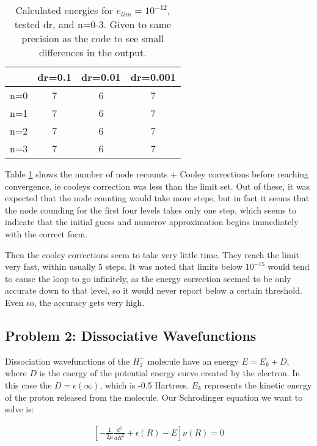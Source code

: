 \documentclass{article}
\begin{document}
    \begin{table}[H]
    	\centering
    	\caption{Calculated energies for $e_{lim}=10^{-12}$, tested dr, and n=0-3. Given to same precision as the code to see small differences in the output. \label{table-counter}}
    	\begin{tabular}{lccc}
    		\hline
    		& dr=0.1 & dr=0.01 & dr=0.001  \\ \hline
    		\multicolumn{1}{l|}{n=0} & 7 & 6 & 7 \\
    		\multicolumn{1}{l|}{n=1} & 7 & 6 & 7  \\
    		\multicolumn{1}{l|}{n=2} & 7 & 6 & 7  \\
    		\multicolumn{1}{l|}{n=3} & 7 & 6 & 7  \\ \hline
    	\end{tabular}
    \end{table}
    
    Table \ref{table-counter} shows the number of node recounts + Cooley corrections before reaching convergence, ie cooleys correction was less than the limit set. Out of these, it was expected that the node counting would take more steps, but in fact it seems that the node counding for the first four levels takes only one step, which seems to indicate that the initial guess and numerov approximation begins immediately with the correct form. 
    
    Then the cooley corrections seem to take very little time. They reach the limit very fast, within usually 5 steps. It was noted that limits below $10^{-15}$ would tend to cause the loop to go infinitely, as the energy correction seemed to be only accurate down to that level, so it would never report below a certain threshold. Even so, the accuracy gets very high.
    
    \subsection{Problem 2: Dissociative Wavefunctions}
   
    Dissociation wavefunctions of the $H_2^+$ molecule have an energy $E= E_k + D$, where $D$ is the energy of the potential energy curve created by the electron. In this case the $D=\epsilon(\infty)$, which is -0.5 Hartrees. $E_k$ represents the kinetic energy of the proton released from the molecule. Our Schrodinger equation we want to solve is:
    
    \large
    \begin{gather}
    	\left[ -\frac{1}{2\mu}\frac{d^2}{dR^2} + \epsilon(R) - E \right]\nu(R) = 0
    \end{gather}
    \normalsize
    
\end{document}
